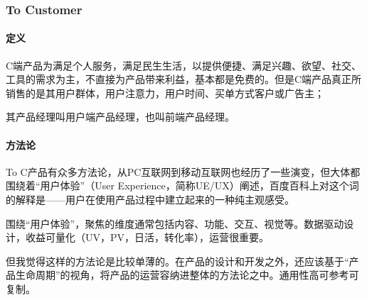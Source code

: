 \documentclass[letterpaper,11pt,english]{sphinxmanual}
\begin{document}
\subsubsection{To Customer}
\label{\detokenize{chapter_introduction/2C:to-customer}}\label{\detokenize{chapter_introduction/2C::doc}}

\paragraph{定义}
\label{\detokenize{chapter_introduction/2C:id1}}
C端产品为满足个人服务，满足民生生活，以提供便捷、满足兴趣、欲望、社交、工具的需求为主，不直接为产品带来利益，基本都是免费的。但是C端产品真正所销售的是其用户群体，用户注意力，用户时间、买单方式客户或广告主；

其产品经理叫用户端产品经理，也叫前端产品经理。%
\begin{footnote}[69]\sphinxAtStartFootnote
{}
%
\end{footnote}


\paragraph{方法论}
\label{\detokenize{chapter_introduction/2C:id2}}
To
C产品有众多方法论，从PC互联网到移动互联网也经历了一些演变，但大体都围绕着“用户体验”（User
Experience，简称UE/UX）阐述，百度百科上对这个词的解释是——用户在使用产品过程中建立起来的一种纯主观感受。

围绕“用户体验”，聚焦的维度通常包括内容、功能、交互、视觉等。数据驱动设计，收益可量化（UV，PV，日活，转化率），运营很重要。%
\begin{footnote}[70]\sphinxAtStartFootnote
{}
%
\end{footnote}

但我觉得这样的方法论是比较单薄的。在产品的设计和开发之外，还应该基于“产品生命周期”的视角，将产品的运营容纳进整体的方法论之中。通用性高可参考可复制。
%
\begin{footnote}[71]\sphinxAtStartFootnote
{}
%
\end{footnote}
\end{document}
